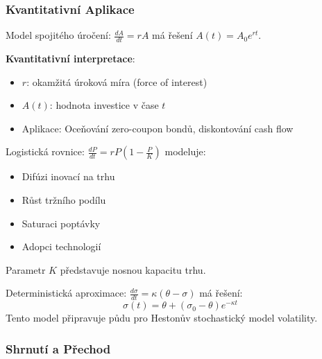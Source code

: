 \vspace{0.8\baselineskip}

\subsubsection{Kvantitativní Aplikace}
\label{subsubsec:kvantitativni-aplikace}

\begin{application}
Model spojitého úročení: $\frac{dA}{dt} = rA$ má řešení $A(t) = A_0 e^{rt}$.

\textbf{Kvantitativní interpretace}:
\begin{itemize}
\item $r$: okamžitá úroková míra (force of interest)
\item $A(t)$: hodnota investice v čase $t$
\item Aplikace: Oceňování zero-coupon bondů, diskontování cash flow
\end{itemize}
\end{application}

\vspace{0.6\baselineskip}

\begin{application}
Logistická rovnice: $\frac{dP}{dt} = rP(1 - \frac{P}{K})$ modeluje:
\begin{itemize}
\item Difúzi inovací na trhu
\item Růst tržního podílu
\item Saturaci poptávky
\item Adopci technologií
\end{itemize}
Parametr $K$ představuje nosnou kapacitu trhu.
\end{application}

\vspace{0.6\baselineskip}

\begin{application}
Deterministická aproximace: $\frac{d\sigma}{dt} = \kappa(\theta - \sigma)$ má řešení:
\[
\sigma(t) = \theta + (\sigma_0 - \theta)e^{-\kappa t}
\]
Tento model připravuje půdu pro Hestonův stochastický model volatility.
\end{application}

\vspace{0.8\baselineskip}

\subsubsection{Shrnutí a Přechod}
\label{subsubsec:shrnuti-presun}

